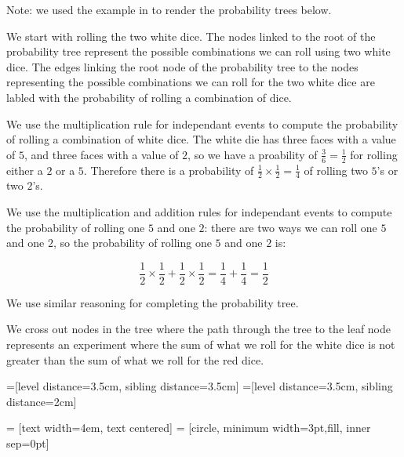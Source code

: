 \documentclass[a4paper,11pt]{article}
\begin{document}
Note: we used the example in \cite{probTreeHowTo} to render the
probability trees below.

We start with rolling the two white dice.  The nodes linked to the root
of the probability tree represent the possible combinations
we can roll using two white dice.  The edges linking the root node
of the probability tree to the nodes representing the possible
combinations we can roll for the two white dice are labled with the
probability of rolling a combination of dice.  

We use the multiplication rule for independant events to compute the 
probability of rolling a combination of white dice. The white die has
three faces with a value of $5$, and three faces with a value of $2$,
so we have a proability of $\frac{3}{6} = \frac{1}{2}$ for rolling 
either a $2$ or a $5$.  Therefore there is a probability of
$\frac{1}{2}\times\frac{1}{2} = \frac{1}{4}$ of rolling two $5$'s or
two $2$'s.

We use the multiplication and addition rules for independant events
to compute the probability of rolling one $5$ and one $2$: there are
two ways we can roll one $5$ and one $2$, so the probability
of rolling one $5$ and one $2$ is:

\begin{equation}
\frac{1}{2} \times \frac{1}{2} + \frac{1}{2} \times \frac{1}{2}
=\frac{1}{4} + \frac{1}{4} = \frac{1}{2}
\end{equation}

We use similar reasoning for completing the probability tree.

We cross out nodes in the tree where the path through the tree
to the leaf node represents an experiment where the sum of what
we roll for the white dice is not greater than the sum of what we
roll for the red dice.

=[level distance=3.5cm, sibling distance=3.5cm]
=[level distance=3.5cm, sibling distance=2cm]

 = [text width=4em, text centered]
 = [circle, minimum width=3pt,fill, inner sep=0pt]
\end{document}
